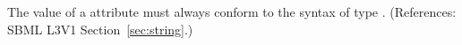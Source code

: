 The value of a  attribute must always conform to the syntax
of type .  (References: SBML L3V1 Section~\ref{sec:string}.)
